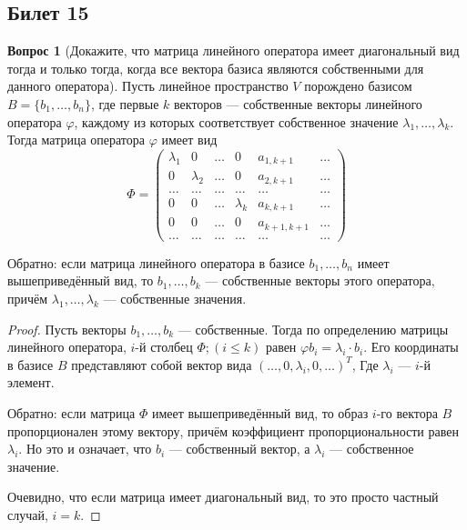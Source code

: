 \documentclass[a4paper,11pt]{article}
\theoremstyle{remark}
\theoremstyle{definition}
\newtheorem{question}{Вопрос}
\numberwithin{question}{subsection}
\begin{document}
\subsection{Билет 15}
\begin{question}[Докажите, что матрица линейного оператора имеет диагональный вид тогда и только тогда, когда все вектора базиса являются собственными для данного оператора]
Пусть линейное пространство \(V\) порождено базисом \(B = \{b_1, \dots, b_n\}\), где первые \(k\) векторов --- собственные векторы линейного оператора \(\varphi\), каждому из которых соответствует собственное значение \(\lambda_1, \dots, \lambda_k\). Тогда матрица оператора \(\varphi\) имеет вид 
\begin{equation*}
	\Phi = 
	\begin{pmatrix}
		\lambda_1 & 0 & \dots & 0 & a_{1, k+1} & \dots \\
		0 & \lambda_2 & \dots & 0 & a_{2, k+1} & \dots \\
		\dots & \dots & \dots & \dots & \dots & \dots \\
		0 & 0 & \dots & \lambda_k & a_{k, k+1} & \dots \\
		0 & 0 & \dots & 0 & a_{k+1, k+1} & \dots \\
		\dots & \dots & \dots & \dots & \dots & \dots
	\end{pmatrix}
\end{equation*}

Обратно: если матрица линейного оператора в базисе \(b_1, \dots, b_n\) имеет вышеприведённый вид, то \(b_1, \dots, b_k\) --- собственные векторы этого оператора, причём \(\lambda_1, \dots, \lambda_k\) --- собственные значения.

\begin{proof}
Пусть векторы \(b_1, \dots, b_k\) --- собственные. Тогда по определению матрицы линейного оператора, \(i\)-й столбец \(\Phi; (i \leqslant k)\) равен \(\varphi b_i = \lambda_i \cdot b_i\). Его координаты в базисе \(B\) представляют собой вектор вида \((\dots, 0, \lambda_i, 0, \dots)^T\), Где \(\lambda_i\) --- \(i\)-й элемент.

Обратно: если матрица \(\Phi\) имеет вышеприведённый вид, то образ \(i\)-го вектора \(B\) пропорционален этому вектору, причём коэффициент пропорциональности равен \(\lambda_i\). Но это и означает, что \(b_i\) --- собственный вектор, а \(\lambda_i\) --- собственное значение. 

Очевидно, что если матрица имеет диагональный вид, то это просто частный случай, \(i = k\).
\end{proof}
\end{question}
\end{document}
